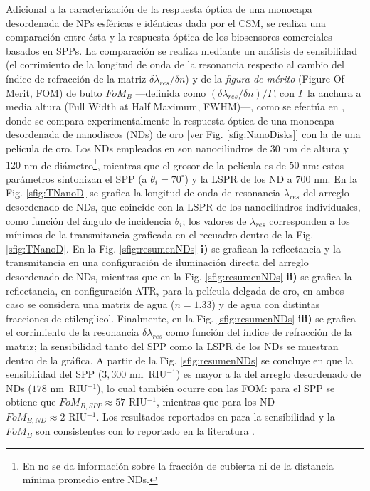 Adicional a la caracterización de la respuesta óptica de una monocapa desordenada de NPs esféricas e idénticas dada por el CSM, se realiza una comparación entre ésta y la respuesta óptica de los biosensores comerciales basados en SPPs. La comparación se realiza mediante un análisis de sensibilidad (el corrimiento de la longitud de onda de la resonancia respecto al cambio del índice de refracción de la matriz $\delta\lambda_{res}/\delta n$) y de la \emph{figura de mérito} (Figure Of Merit, FOM) de bulto $\textit{FoM}_B$ ---definida como $(\delta\lambda_{res}/\delta n)/\Gamma$, con $\Gamma$ la anchura a media altura (Full Width at Half Maximum, FWHM)---, como se  efectúa en \cite{svedendahl2009refractometric}, donde se compara experimentalmente la respuesta óptica de una monocapa desordenada de nanodiscos (NDs)  de oro [ver Fig. \ref{sfig:NanoDisks}] con la de una película de oro. Los NDs empleados en \cite{svedendahl2009refractometric} son nanocilindros de $30$ nm de altura y  $120$ nm de diámetro\footnote{En \cite{svedendahl2009refractometric} no se da información sobre la fracción de cubierta ni de la distancia mínima promedio entre NDs.}, mientras que el grosor de la película es de $50$ nm: estos parámetros sintonizan el SPP (a $\theta_i=70^\circ$) y la LSPR de los ND a $700$ nm. En la Fig. \ref{sfig:TNanoD} se grafica la longitud de onda de resonancia  $\lambda_{res}$ del arreglo desordenado de NDs, que coincide con la LSPR de los nanocilindros individuales, como función del ángulo de incidencia $\theta_i$; los valores de $\lambda_{res}$ corresponden a los mínimos de la transmitancia graficada en el recuadro dentro de la Fig. \ref{sfig:TNanoD}. En la Fig. \ref{sfig:resumenNDs} \textbf{i)} se grafican la reflectancia y la transmitancia  en una configuración de iluminación directa del arreglo desordenado de NDs, mientras que en la Fig. \ref{sfig:resumenNDs} \textbf{ii)} se grafica la reflectancia, en configuración ATR, para la película delgada de oro, en ambos caso se considera una matriz de agua ($n=1.33$) y de agua con distintas fracciones de etilenglicol. Finalmente, en la Fig. \ref{sfig:resumenNDs} \textbf{iii)} se grafica el corrimiento de la resonancia $\delta\lambda_{res}$ como función del índice de refracción de la matriz; la sensibilidad tanto del SPP como la LSPR de los NDs se muestran dentro de la gráfica. A partir de la Fig. \ref{sfig:resumenNDs} se concluye en \cite{svedendahl2009refractometric} que la sensibilidad del SPP ($3,300$ nm~\mbox{RIU$^{-1}$}) es mayor a la del arreglo desordenado de NDs ($178$ nm~\mbox{RIU$^{-1}$}), lo cual también ocurre con las FOM: para el SPP se obtiene que $\textit{FoM}_{B,\textit{SPP}}\approx 57 \mbox{ RIU$^{-1}$}$, mientras que para los ND $\textit{FoM}_{B,\textit{ND}}\approx 2\mbox{ RIU$^{-1}$}$. Los resultados reportados en \cite{svedendahl2009refractometric} para la sensibilidad y la $\textit{FoM}_B$ son consistentes con lo reportado en la literatura \cite{brian2009sensitivity,cahill1997surface}.
 
